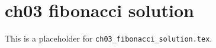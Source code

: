\chapter{ch03 fibonacci solution}
\label{ch03_fibonacci_solution}

This is a placeholder for \texttt{ch03_fibonacci_solution.tex}.


